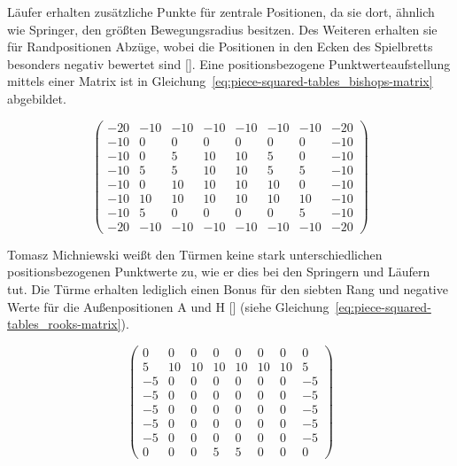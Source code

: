 \bigskip

\noindent Läufer erhalten zusätzliche Punkte für zentrale Positionen, da sie dort, ähnlich wie Springer, den größten Bewegungsradius besitzen.
Des Weiteren erhalten sie für Randpositionen Abzüge, wobei die Positionen in den Ecken des Spielbretts besonders negativ bewertet sind [\cite{Wiki2018}].
Eine positionsbezogene Punktwerteaufstellung mittels einer Matrix ist in Gleichung~\ref{eq:piece-squared-tables_bishops-matrix} abgebildet.

\begin{equation} \label{eq:piece-squared-tables_bishops-matrix}
\begin{pmatrix}
-20 & -10 & -10 & -10 & -10 & -10 & -10 & -20 \\
-10 & 0 & 0 & 0 & 0 & 0 & 0 & -10 \\
-10 & 0 & 5 & 10 & 10 & 5 & 0 & -10 \\
-10 & 5 & 5 & 10 & 10 & 5 & 5 & -10 \\
-10 & 0 & 10 & 10 & 10 & 10 & 0 & -10 \\
-10 & 10 & 10 & 10 & 10 & 10 & 10 & -10 \\
-10 & 5 & 0 & 0 & 0 & 0 & 5 & -10 \\
-20 & -10 & -10 & -10 & -10 & -10 & -10 & -20
\end{pmatrix}
\end{equation}

\bigskip

\noindent Tomasz Michniewski weißt den Türmen keine stark unterschiedlichen positionsbezogenen Punktwerte zu, wie er dies bei den Springern und Läufern tut.
Die Türme erhalten lediglich einen Bonus für den siebten Rang und negative Werte für die Außenpositionen A und H [\cite{Wiki2018}] (siehe Gleichung~\ref{eq:piece-squared-tables_rooks-matrix}).

\begin{equation} \label{eq:piece-squared-tables_rooks-matrix}
\begin{pmatrix}
0 & 0 & 0 & 0 & 0 & 0 & 0 & 0 \\
5 & 10 & 10 & 10 & 10 & 10 & 10 & 5 \\
-5 & 0 & 0 & 0 & 0 & 0 & 0 & -5 \\
-5 & 0 & 0 & 0 & 0 & 0 & 0 & -5 \\
-5 & 0 & 0 & 0 & 0 & 0 & 0 & -5 \\
-5 & 0 & 0 & 0 & 0 & 0 & 0 & -5 \\
-5 & 0 & 0 & 0 & 0 & 0 & 0 & -5 \\
0 & 0 & 0 & 5 & 5 & 0 & 0 & 0
\end{pmatrix}
\end{equation}


